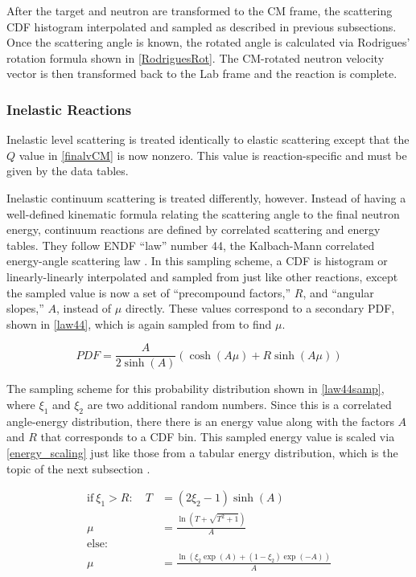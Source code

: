 After the target and neutron are transformed to the CM frame, the scattering CDF histogram interpolated and sampled as described in previous subsections.  Once the scattering angle is known, the rotated angle is calculated via Rodrigues' rotation formula shown in \eqref{RodriguesRot}.  The CM-rotated neutron velocity vector is then transformed back to the Lab frame and the reaction is complete.

\subsubsection{Inelastic Reactions}

Inelastic level scattering is treated identically to elastic scattering except that the $Q$ value in \eqref{finalvCM} is now nonzero.  This value is reaction-specific and must be given by the data tables.  

Inelastic continuum scattering is treated differently, however.  Instead of having a well-defined kinematic formula relating the scattering angle to the final neutron energy, continuum reactions are defined by correlated scattering and energy tables.  They follow ENDF ``law'' number 44, the Kalbach-Mann correlated energy-angle scattering law \cite{mcnp} \cite{openmc}.  In this sampling scheme, a CDF is histogram or linearly-linearly interpolated and sampled from just like other reactions, except the sampled value is now a set of ``precompound factors,'' $R$, and ``angular slopes,'' $A$, instead of $\mu$ directly.  These values correspond to a secondary PDF, shown in \eqref{law44}, which is again sampled from to find $\mu$.

\begin{equation}
\label{law44}
PDF = \frac{A}{2 \sinh (A)} ( \cosh(A\mu)+R \sinh (A\mu))
\end{equation}

The sampling scheme for this probability distribution shown in \eqref{law44samp}, where $\xi_1$ and $\xi_2$ are two additional random numbers.  Since this is a correlated angle-energy distribution, there there is an energy value along with the factors $A$ and $R$ that corresponds to a CDF bin.  This sampled energy value is scaled via \eqref{energy_scaling} just like those from a tabular energy distribution, which is the topic of the next subsection \cite{3rdsampler}\cite{openmc}.

\begin{equation}
\label{law44samp}
\begin{split}
\mathrm{if} \: \xi_1 > R:  \quad T&=(2\xi_2-1)\sinh(A)\\
\mu &= \frac{\ln(T+\sqrt{T^2+1})}{A}\\
\mathrm{else: }  \qquad & \\
\mu &= \frac{ \ln(\xi_2 \exp(A) + (1-\xi_2)\exp(-A))}{A}
\end{split}
\end{equation}

